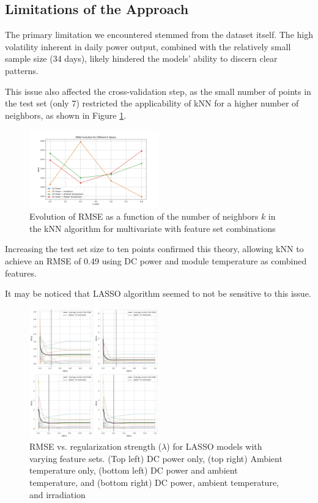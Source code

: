 \subsection{Limitations of the Approach}

The primary limitation we encountered stemmed from the dataset itself. The high volatility inherent in daily power output, combined with the relatively small sample size (34 days), likely hindered the models' ability to discern clear patterns.

This issue also affected the cross-validation step, as the small number of points in the test set (only 7) restricted the applicability of kNN for a higher number of neighbors, as shown in Figure \ref{fig:CV_F_Evo}.

\begin{figure}[h]
    \centering
    \includegraphics[width=0.5\textwidth]{Figures/CV_F_Evo.png}
    \caption{Evolution of RMSE as a function of the number of neighbors $k$ in the kNN algorithm for multivariate with feature set combinations}
    \label{fig:CV_F_Evo}
\end{figure}

Increasing the test set size to ten points confirmed this theory, allowing kNN to achieve an RMSE of 0.49 using DC power and module temperature as combined features.

It may be noticed that LASSO algorithm seemed to not be sensitive to this issue.

\begin{figure}[h]
    \centering
    \includegraphics[width=0.5\textwidth]{Figures/rmse_vs_alpha_lasso.jpg}
    \caption{RMSE vs. regularization strength ($\lambda$) for LASSO models with varying feature sets. (Top left) DC power only, (top right) Ambient temperature only, (bottom left) DC power and ambient temperature, and (bottom right) DC power, ambient temperature, and irradiation}
    \label{fig:rmse-vs-alpha}
\end{figure}

